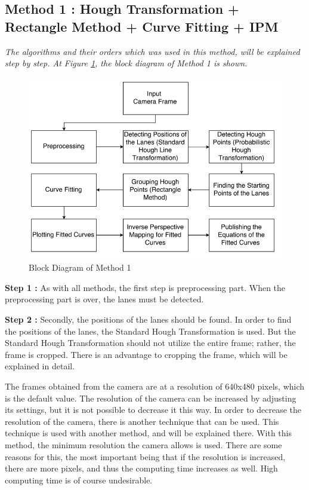 %
\subsection{Method 1 : Hough Transformation + Rectangle Method + Curve Fitting + IPM}\label{sec:Case 1}

\emph{\color{green}The algorithms and their orders which was used in this method, will be explained step by step. At Figure \ref{fig:Case1_BlockDiagram}, the block diagram of Method 1 is shown.}



\begin{figure}[H]
 \centering
  \includegraphics[width=1\textwidth]{./Bilder/Case1_BlockDiagram.png}		 \caption{Block Diagram of Method 1}
  \label{fig:Case1_BlockDiagram}
\end{figure}



\textbf{Step 1 : }As with all methods, the first step is preprocessing part. When the preprocessing part is over, the lanes must be detected. 

\textbf{Step 2 : }Secondly, the positions of the lanes should be found. In order to find the positions of the lanes, the Standard Hough Transformation is used. But the Standard Hough Transformation should not utilize the entire frame; rather, the frame is cropped. There is an advantage to cropping the frame, which will be explained in detail.


The frames obtained from the camera are at a resolution of 640x480 pixels, which is the default value. The resolution of the camera can be increased by adjusting its settings, but it is not possible to decrease it this way. In order to decrease the resolution of the camera, there is another technique that can be used. This technique is used with another method, and will be explained there. With this method, the minimum resolution the camera allows is used. There are some reasons for this, the most important being that if the resolution is increased, there are more pixels, and thus the computing time increases as well. High computing time is of course undesirable.
 
